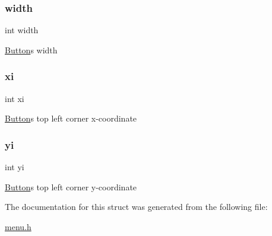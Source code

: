 \subsubsection{\texorpdfstring{width}{width}}
{\footnotesize\ttfamily int width}

\hyperlink{struct_button}{Button}\textquotesingle{}s width \hypertarget{struct_button_af55497c668909df153bd9818cf765594}{}\label{struct_button_af55497c668909df153bd9818cf765594} 
\subsubsection{\texorpdfstring{xi}{xi}}
{\footnotesize\ttfamily int xi}

\hyperlink{struct_button}{Button}\textquotesingle{}s top left corner x-\/coordinate \hypertarget{struct_button_a525987ab72296fdd74c5bad7185fc0a4}{}\label{struct_button_a525987ab72296fdd74c5bad7185fc0a4} 
\subsubsection{\texorpdfstring{yi}{yi}}
{\footnotesize\ttfamily int yi}

\hyperlink{struct_button}{Button}\textquotesingle{}s top left corner y-\/coordinate 

The documentation for this struct was generated from the following file\+:\begin{DoxyCompactItemize}
\item 
\hyperlink{menu_8h}{menu.\+h}\end{DoxyCompactItemize}
